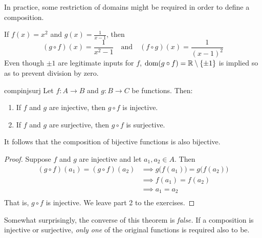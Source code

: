 In practice, some restriction of domains might be required in order to define a composition.

\begin{example}{}{}
	If $f(x)=x^2$ and $g(x)=\frac 1{x-1}$, then
	\[
		(g\circ f)(x)=\frac 1{x^2-1}\quad\text{and}\quad(f\circ g)(x)=\frac 1{(x-1)^2}
	\]
	Even though $\pm 1$ are legitimate inputs for $f$, $\operatorname{dom}(g\circ f) =\mathbb{R}\setminus\{\pm 1\}$ is implied so as to prevent division by zero. 
\end{example}


\begin{thm}{}{compinjsurj}
	Let $f:A\to B$ and $g:B\to C$ be functions. Then:
	\begin{enumerate}
	  \item If $f$ and $g$ are injective, then $g\circ f$ is injective.
	  \item If $f$ and $g$ are surjective, then $g\circ f$ is surjective.
	\end{enumerate}
	It follows that the composition of bijective functions is also bijective.
\end{thm}

\begin{proof}
	Suppose $f$ and $g$ are injective and let $a_1,a_2\in A$. Then
  \begin{align*}
  (g\circ f)(a_1)=(g\circ f)(a_2)&\implies g\big(f(a_1)\big)=g\big(f(a_2)\big)\\
  &\implies f(a_1)=f(a_2)\tag*{(since $g$ is injective)}\\
  &\implies a_1=a_2\tag*{(since $f$ is injective)}\\[-25pt]
  \end{align*}
	That is, $g\circ f$ is injective. We leave part 2 to the exercises.
\end{proof}

Somewhat surprisingly, the converse of this theorem is \emph{false.} If a composition is injective or surjective, \emph{only one} of the original functions is required also to be.

